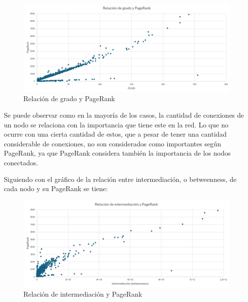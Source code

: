 \documentclass[12pt]{article}
\begin{document}
\begin{figure}[H]
    \begin{center}
        \includegraphics[scale=0.6]{images/distribucion_grado_pagerank.png}
    \end{center}
    \caption{Relación de grado y PageRank}
    \label{fig:distribution-degree}
\end{figure}

Se puede observar como en la mayoría de los casos, la cantidad de conexiones de un nodo se relaciona con la importancia que tiene este en la red. Lo que no ocurre con una cierta cantidad de estos, que a pesar de tener una cantidad considerable de conexiones, no son considerados como importantes según PageRank, ya que PageRank considera también la importancia de los nodos conectados.

Siguiendo con el gráfico de la relación entre intermediación, o betweenness, de cada nodo y su PageRank se tiene: 

\begin{figure}[H]
    \begin{center}
        \includegraphics[scale=0.6]{images/distribucion_betweenness_pagerank.png}
    \end{center}
    \caption{Relación de intermediación y PageRank}
    \label{fig:betweenness-page-rank}
\end{figure}
\end{document}
